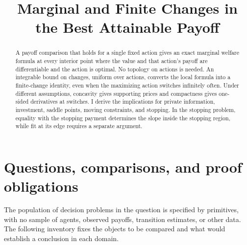 \documentclass[11pt]{article}
\title{Marginal and Finite Changes in the Best Attainable Payoff}
\author{}
\date{}
\begin{document}
\maketitle

\begin{abstract}
A payoff comparison that holds for a single fixed action gives an exact marginal welfare formula at every interior point where the value and that action's payoff are differentiable and the action is optimal. No topology on actions is needed. An integrable bound on changes, uniform over actions, converts the local formula into a finite-change identity, even when the maximizing action switches infinitely often. Under different assumptions, concavity gives supporting prices and compactness gives one-sided derivatives at switches. I derive the implications for private information, investment, saddle points, moving constraints, and stopping. In the stopping problem, equality with the stopping payment determines the slope inside the stopping region, while fit at its edge requires a separate argument.
\end{abstract}

\section{Questions, comparisons, and proof obligations}\label{sec:plan}

The population of decision problems in the question is specified by primitives, with no sample of agents, observed payoffs, transition estimates, or other data. The following inventory fixes the objects to be compared and what would establish a conclusion in each domain.
\end{document}
